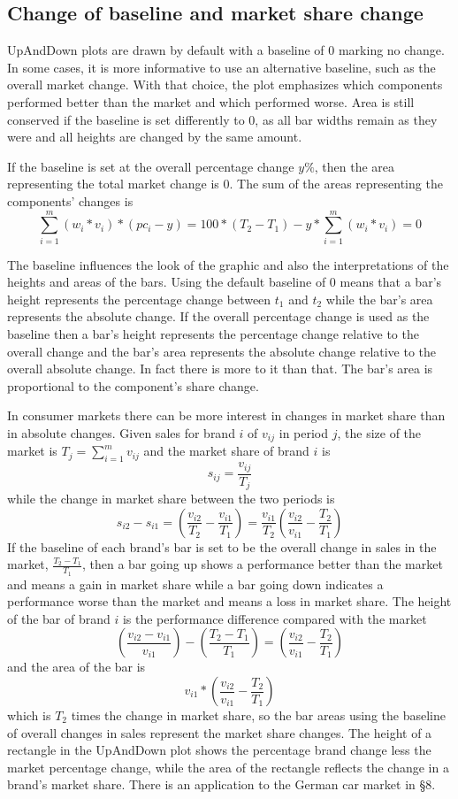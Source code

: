 \hypertarget{change-of-baseline-and-market-share-change}{%
\subsection{Change of baseline and market share change}\label{change-of-baseline-and-market-share-change}}

UpAndDown plots are drawn by default with a baseline of \(0\) marking no change. In some cases, it is more informative to use an alternative baseline, such as the overall market change. With that choice, the plot emphasizes which components performed better than the market and which performed worse. Area is still conserved if the baseline is set differently to \(0\), as all bar widths remain as they were and all heights are changed by the same amount.

If the baseline is set at the overall percentage change \(y\%\), then the area representing the total market change is \(0\). The sum of the areas representing the components' changes is
\[\sum_{i=1}^m(w_i*v_i)*(pc_i-y)=100*(T_2-T_1)-y*\sum_{i=1}^m(w_i*v_i)=0\]

The baseline influences the look of the graphic and also the interpretations of the heights and areas of the bars. Using the default baseline of \(0\) means that a bar's height represents the percentage change between \(t_1\) and \(t_2\) while the bar's area represents the absolute change. If the overall percentage change is used as the baseline then a bar's height represents the percentage change relative to the overall change and the bar's area represents the absolute change relative to the overall absolute change. In fact there is more to it than that. The bar's area is proportional to the component's share change.

In consumer markets there can be more interest in changes in market share than in absolute changes. Given sales for brand \(i\) of \(v_{ij}\) in period \(j\), the size of the market is \(T_j=\sum_{i=1}^mv_{ij}\) and the market share of brand \(i\) is
\[s_{ij}=\frac{v_{ij}}{T_j}\]
while the change in market share between the two periods is
\[s_{i2}-s_{i1}=\left(\frac{v_{i2}}{T_2}-\frac{v_{i1}}{T_1}\right)=\frac{v_{i1}}{T_2}\left(\frac{v_{i2}}{v_{i1}}-\frac{T_2}{T_1}\right)\]
If the baseline of each brand's bar is set to be the overall change in sales in the market, \(\frac{T_2-T_1}{T_1}\), then a bar going up shows a performance better than the market and means a gain in market share while a bar going down indicates a performance worse than the market and means a loss in market share. The height of the bar of brand \(i\) is the performance difference compared with the market
\[\left(\frac{v_{i2}-v_{i1}}{v_{i1}}\right)-\left(\frac{T_2-T_1}{T_1}\right)=\left(\frac{v_{i2}}{v_{i1}}-\frac{T_2}{T_1}\right)\]
and the area of the bar is
\[v_{i1}*\left(\frac{v_{i2}}{v_{i1}}-\frac{T_2}{T_1}\right)\]
which is \(T_2\) times the change in market share, so the bar areas using the baseline of overall changes in sales represent the market share changes. The height of a rectangle in the UpAndDown plot shows the percentage brand change less the market percentage change, while the area of the rectangle reflects the change in a brand's market share. There is an application to the German car market in §8.

